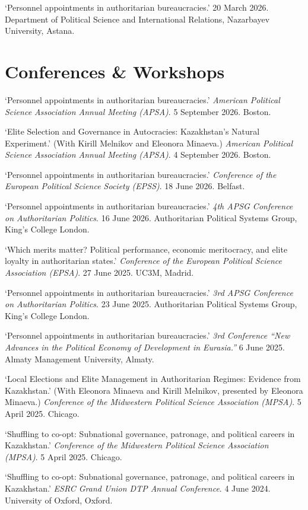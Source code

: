 \documentclass[11pt, a4paper]{article}
\begin{document}
`Personnel appointments in authoritarian bureaucracies.' 20 March 2026. Department of Political Science and International Relations, Nazarbayev University, Astana.

\section{Conferences \& Workshops}

`Personnel appointments in authoritarian bureaucracies.' \textit{American Political Science Association Annual Meeting (APSA)}. 5 September 2026. Boston.

`Elite Selection and Governance in Autocracies: Kazakhstan's Natural Experiment.' (With Kirill Melnikov and Eleonora Minaeva.)  \textit{American Political Science Association Annual Meeting (APSA)}. 4 September 2026. Boston.

`Personnel appointments in authoritarian bureaucracies.' \textit{Conference of the European Political Science Society (EPSS)}. 18 June 2026. Belfast.

`Personnel appointments in authoritarian bureaucracies.' \textit{4th APSG Conference on Authoritarian Politics}. 16 June 2026. Authoritarian Political Systems Group, King's College London.

`Which merits matter? Political performance, economic meritocracy, and elite loyalty in authoritarian states.' \textit{Conference of the European Political Science Association (EPSA)}. 27 June 2025. UC3M, Madrid.

`Personnel appointments in authoritarian bureaucracies.' \textit{3rd APSG Conference on Authoritarian Politics}. 23 June 2025. Authoritarian Political Systems Group, King's College London.

`Personnel appointments in authoritarian bureaucracies.' \textit{3rd Conference ``New Advances in the Political Economy of Development in Eurasia.''} 6 June 2025. Almaty Management University, Almaty.

`Local Elections and Elite Management in Authoritarian Regimes: Evidence from Kazakhstan.' (With Eleonora Minaeva and Kirill Melnikov, presented by Eleonora Minaeva.) \textit{Conference of the Midwestern Political Science Association (MPSA)}. 5 April 2025. Chicago.

`Shuffling to co-opt: Subnational governance, patronage, and political careers in Kazakhstan.' \textit{Conference of the Midwestern Political Science Association (MPSA)}. 5 April 2025. Chicago.

`Shuffling to co-opt: Subnational governance, patronage, and political careers in Kazakhstan.' \textit{ESRC Grand Union DTP Annual Conference}. 4 June 2024. University of Oxford, Oxford.
\end{document}
